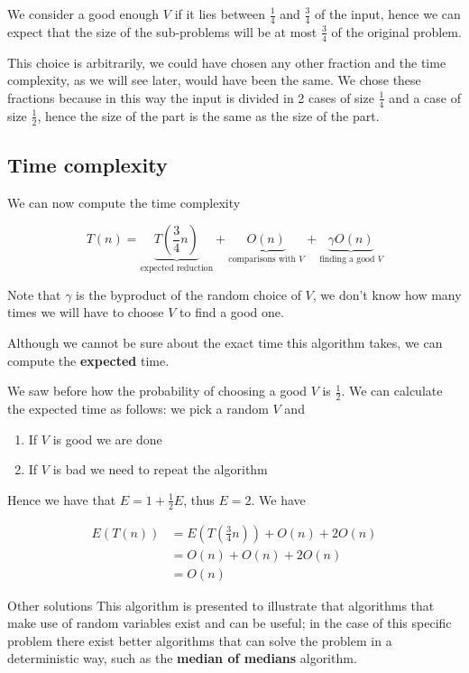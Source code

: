 \documentclass[12pt]{extarticle}
\begin{document}
We consider a good enough $V$ if it lies between $\frac{1}{4}$ and $\frac{3}{4}$ of the input,
hence we can expect that the size of the sub-problems will be at most $\frac{3}{4}$ of the original problem.

This choice is arbitrarily, we could have chosen any other fraction and the time complexity,
as we will see later, would have been the same.
We chose these fractions because in this way the input
is divided in 2  cases of size $\frac{1}{4}$ and a  case of size $\frac{1}{2}$,
hence the size of the  part is the same as the size of the  part.

\subsection{Time complexity}

We can now compute the time complexity

$$
    T(n) = \underbrace{T\left(\frac{3}{4}n\right)}
    _{\text{expected reduction}} +
    \underbrace{O(n)}_{\text{comparisons with } V}
    + \underbrace{\gamma O(n)}_{\text{finding a good } V}
$$

Note that $\gamma$ is the byproduct of the random choice of $V$,
we don't know how many times we will have to choose $V$ to find a good one.

Although we cannot be sure about the exact time this algorithm takes,
we can compute the \textbf{expected} time.

We saw before how the probability of choosing a good $V$ is $\frac{1}{2}$.
We can calculate the expected time as follows:
we pick a random $V$ and

\begin{enumerate}
    \item If $V$ is good we are done
    \item If $V$ is bad we need to repeat the algorithm
\end{enumerate}

Hence we have that $E = 1 + \frac{1}{2} E$, thus $E = 2$.
We have


\begin{align*}
    E(T(n)) & = E\left(T\left(\frac{3}{4}n\right)\right) + O(n) + 2O(n) \\
            & = O(n) + O(n) + 2O(n)                                     \\
            & = O(n)
\end{align*}

\begin{notebox}{Other solutions}
    This algorithm is presented to illustrate that algorithms that make use of random variables exist and can be useful;
    in the case of this specific problem there exist better algorithms that can solve the problem in a deterministic way,
    such as the \textbf{median of medians} algorithm.
\end{notebox}
\end{document}
